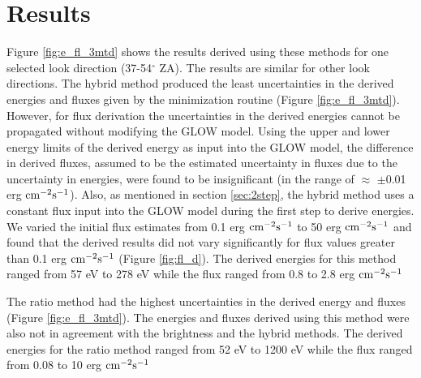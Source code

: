 \section{Results}
Figure \ref{fig:e_fl_3mtd} shows the results derived using these methods for one selected look direction (37-54$^\circ$ ZA). The results are similar for other look directions. The hybrid method produced the least uncertainties in the derived energies and fluxes given by the minimization routine (Figure \ref{fig:e_fl_3mtd}). However, for flux derivation the uncertainties in the derived energies cannot be propagated without modifying the GLOW model. Using the upper and lower energy limits of the derived energy as input into the GLOW model, the difference in derived fluxes, assumed to be the estimated uncertainty in fluxes due to the uncertainty in energies, were found to be insignificant (in the range of $\approx$ $\pm$0.01 erg $\rm cm^{-2} s^{-1}$). Also, as mentioned in section \ref{sec:2step}, the hybrid method uses a constant flux input into the GLOW model during the first step to derive energies. We varied the initial flux estimates from
0.1 erg $\rm cm^{-2} s^{-1}$ to 50 erg $\rm cm^{-2} s^{-1}$ and found that the derived results did not vary significantly for flux values greater than 0.1 erg $\rm cm^{-2} s^{-1}$ (Figure \ref{fig:fl_d}). The derived energies for this method ranged from 57 eV to 278 eV while the flux ranged from 0.8 to 2.8 erg $\rm cm^{-2} s^{-1}$ 



The ratio method had the highest uncertainties in the derived energy and fluxes (Figure \ref{fig:e_fl_3mtd}). The energies and fluxes derived using this method were also not in agreement with the brightness and the hybrid methods. The derived energies for the ratio method ranged from 52 eV to 1200 eV while the flux ranged from 0.08 to 10 erg $\rm cm^{-2} s^{-1}$ 

